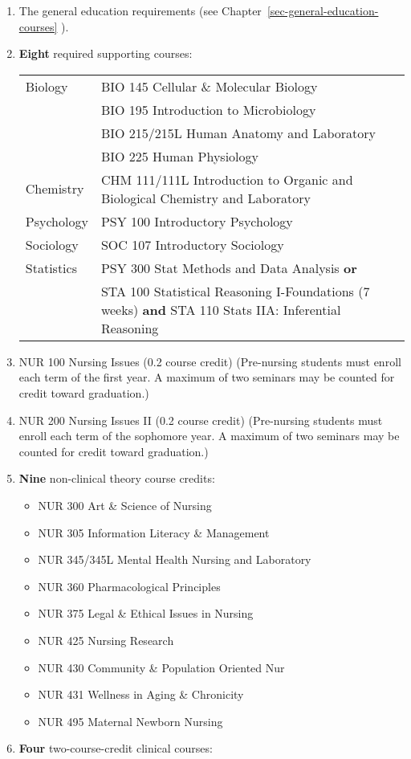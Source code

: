 \documentclass[
  letterpaper,
]{scrbook}
\providecommand{\tightlist}{%
  \setlength{\itemsep}{0pt}\setlength{\parskip}{0pt}}
\renewcommand\toprule[2]\relax
\renewcommand\bottomrule[2]\relax
\begin{document}
\begin{enumerate}
\def\labelenumi{\arabic{enumi}.}
\item
  The general education requirements (see
  Chapter~\ref{sec-general-education-courses} ).
\item
  \textbf{Eight} required supporting courses:

  \begin{longtable}[]{@{}
    >{\raggedright\arraybackslash}p{}
    >{\raggedleft\arraybackslash}p{}@{}}
  \toprule\noalign{}
  \endhead
  \bottomrule\noalign{}
  \endlastfoot
  Biology & BIO 145 Cellular \& Molecular Biology \\
  ~ & BIO 195 Introduction to Microbiology \\
  ~ & BIO 215/215L Human Anatomy and Laboratory \\
  ~ & BIO 225 Human Physiology \\
  Chemistry & CHM 111/111L Introduction to Organic and Biological
  Chemistry and Laboratory \\
  Psychology & PSY 100 Introductory Psychology \\
  Sociology & SOC 107 Introductory Sociology \\
  Statistics & PSY 300 Stat Methods and Data Analysis \textbf{or} \\
  ~ & STA 100 Statistical Reasoning I-Foundations (7 weeks) \textbf{and}
  STA 110 Stats IIA: Inferential Reasoning \\
  \end{longtable}
\item
  NUR 100 Nursing Issues (0.2 course credit) (Pre-nursing students must
  enroll each term of the first year. A maximum of two seminars may be
  counted for credit toward graduation.)
\item
  NUR 200 Nursing Issues II (0.2 course credit) (Pre-nursing students
  must enroll each term of the sophomore year. A maximum of two seminars
  may be counted for credit toward graduation.)
\item
  \textbf{Nine} non-clinical theory course credits:

  \begin{itemize}
  \tightlist
  \item
    NUR 300 Art \& Science of Nursing
  \item
    NUR 305 Information Literacy \& Management
  \item
    NUR 345/345L Mental Health Nursing and Laboratory
  \item
    NUR 360 Pharmacological Principles
  \item
    NUR 375 Legal \& Ethical Issues in Nursing
  \item
    NUR 425 Nursing Research
  \item
    NUR 430 Community \& Population Oriented Nur
  \item
    NUR 431 Wellness in Aging \& Chronicity
  \item
    NUR 495 Maternal Newborn Nursing
  \end{itemize}
\item
  \textbf{Four} two-course-credit clinical courses:


\end{enumerate}
\end{document}
